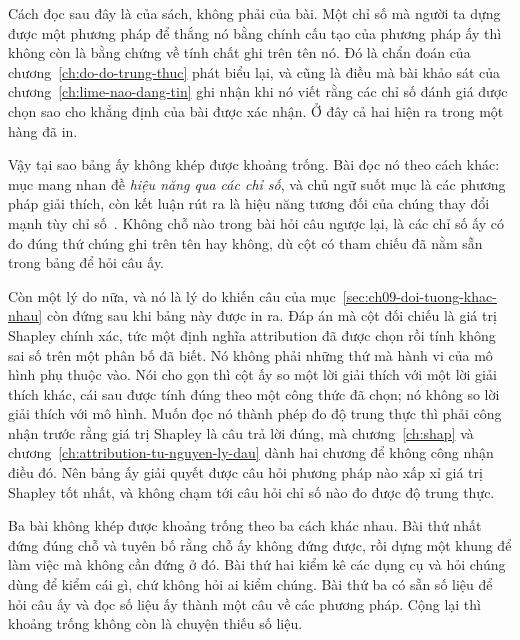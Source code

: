 %
Cách đọc sau đây là của sách, không phải của bài. Một chỉ số mà người ta dựng
được một phương pháp để thắng nó bằng chính cấu tạo của phương pháp ấy thì không
còn là bằng chứng về tính chất ghi trên tên nó. Đó là chẩn đoán của
chương~\ref{ch:do-do-trung-thuc} phát biểu lại, và cũng là điều mà bài khảo sát
của chương~\ref{ch:lime-nao-dang-tin} ghi nhận khi nó viết rằng các chỉ số đánh
giá được chọn sao cho khẳng định của bài được xác nhận. Ở đây cả hai hiện ra
trong một hàng đã in.

Vậy tại sao bảng ấy không khép được khoảng trống. Bài đọc nó theo cách khác: mục
mang nhan đề \emph{hiệu năng qua các chỉ số}, và chủ ngữ suốt mục là các phương
pháp giải thích, còn kết luận rút ra là hiệu năng tương đối của chúng thay đổi
mạnh tùy chỉ số~\autocite{mxaibench}. Không chỗ nào trong bài hỏi câu ngược lại,
là các chỉ số ấy có đo đúng thứ chúng ghi trên tên hay không, dù cột có tham
chiếu đã nằm sẵn trong bảng để hỏi câu ấy.

%
Còn một lý do nữa, và nó là lý do khiến câu của
mục~\ref{sec:ch09-doi-tuong-khac-nhau} còn đứng sau khi bảng này được in ra.
Đáp án mà cột  đối chiếu là giá trị Shapley chính xác, tức một
định nghĩa attribution đã được chọn rồi tính không sai số trên một phân bố đã
biết. Nó không phải những thứ mà hành vi của mô hình phụ thuộc vào. Nói cho gọn
thì cột ấy so một lời giải thích với một lời giải thích khác, cái sau được tính
đúng theo một công thức đã chọn; nó không so lời giải thích với mô hình. Muốn đọc
nó thành phép đo độ trung thực thì phải công nhận trước rằng giá trị Shapley là
câu trả lời đúng, mà chương~\ref{ch:shap} và
chương~\ref{ch:attribution-tu-nguyen-ly-dau} dành hai chương để không công nhận
điều đó. Nên bảng ấy giải quyết được câu hỏi phương pháp nào xấp xỉ giá trị
Shapley tốt nhất, và không chạm tới câu hỏi chỉ số nào đo được độ trung thực.

%
Ba bài không khép được khoảng trống theo ba cách khác nhau. Bài thứ nhất đứng
đúng chỗ và tuyên bố rằng chỗ ấy
không đứng được, rồi dựng một khung để làm việc mà không cần đứng ở đó. Bài thứ
hai kiểm kê các dụng cụ và hỏi chúng dùng để kiểm cái gì, chứ không hỏi ai kiểm
chúng. Bài thứ ba có sẵn số liệu để hỏi câu ấy và đọc số liệu ấy thành một câu về
các phương pháp. Cộng lại thì khoảng trống không còn là chuyện thiếu số liệu.
